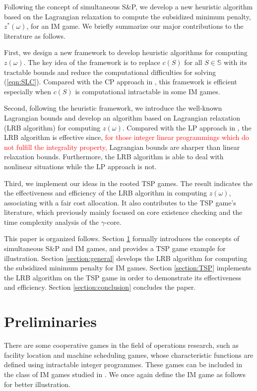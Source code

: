 \documentclass[authoryear,review,12pt]{elsarticle}
\begin{document}
Following the concept of simultaneous S\&P, we develop a new heuristic algorithm based on the Lagrangian relaxation to compute the subsidized minimum penalty, $z^*(\omega)$, for an IM game.
We briefly summarize our major contributions to the literature as follows.

First, we design a new framework to develop heuristic algorithms for computing $z(\omega)$.
The key idea of the framework is to replace $c(S)$ for all $S \in \mathbb{S}$ with its tractable bounds and reduce the computational difficulties for solving (\ref{eqn:SLC}).
Compared with the CP approach in \cite{leastcore2018}, this framework is efficient especially when $c(S)$ is computational intractable in some IM games.


Second, following the heuristic framework, we introduce the well-known Lagrangian bounds and develop an algorithm based on Lagrangian relaxation (LRB algorithm) for computing $z(\omega)$.
Compared with the LP approach in \cite{leastcore2018}, the LRB algorithm is effective since, \textcolor{red}{for those integer linear programmings which do not fulfill the integrality property,} Lagrangian bounds are sharper than linear relaxation bounds.
Furthermore, the LRB algorithm is able to deal with nonlinear situations while the LP approach is not.

Third, we implement our ideas in the rooted TSP games.
The result indicates the the effectiveness and efficiency of the LRB algorithm in computing $z(\omega)$, associating with a fair cost allocation.
It also contributes to the TSP game's literature, which previously mainly focused on core existence checking and the time complexity analysis of the $\gamma$-core.


This paper is organized follows.
Section \ref{section:pre} formally introduces the concepts of simultaneous S\&P and IM games, and provides a TSP game example for illustration.
Section \ref{section:general} develops the LRB algorithm for computing the subsidized minimum penalty for IM games.
Section \ref{section:TSP} implements the LRB algorithm on the TSP game in order to demonstrate its effectiveness and efficiency.
Section \ref{section:conclusion} concludes the paper.


\section{Preliminaries}\label{section:pre}
There are some cooperative games in the field of operations research, such as facility location and machine scheduling games, whose characteristic functions are defined using intractable integer programmes.
These games can be included in the class of IM games studied in \cite{Caprara2010LPB}.
We once again define the IM game as follows for better illustration.
\end{document}
